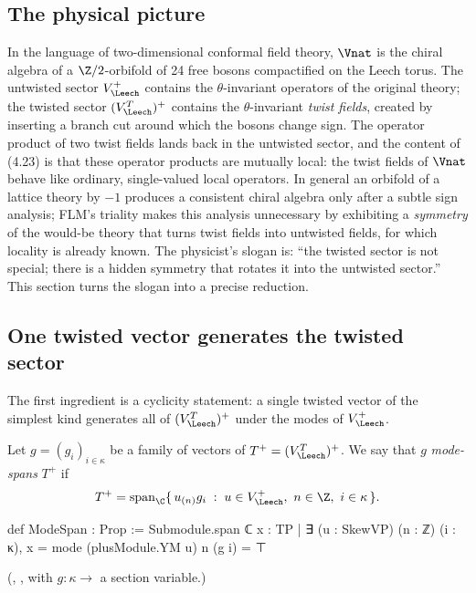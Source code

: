 \subsection{The physical picture}

In the language of two-dimensional conformal field theory, $\Vnat$ is the chiral algebra of a
$\Z/2$-orbifold of 24 free bosons compactified on the Leech torus.  The untwisted sector
$V_\Leech^+$ contains the $\theta$-invariant operators of the original theory; the twisted sector
$(V_\Leech^T)^+$ contains the $\theta$-invariant \emph{twist fields}, created by inserting a branch
cut around which the bosons change sign.  The operator product of two twist fields lands back in
the untwisted sector, and the content of (4.23) is that these operator products are mutually local:
the twist fields of $\Vnat$ behave like ordinary, single-valued local operators.  In general an
orbifold of a lattice theory by $-1$ produces a consistent chiral algebra only after a
subtle sign analysis; FLM's triality makes this analysis unnecessary by exhibiting a
\emph{symmetry} of the would-be theory that turns twist fields into untwisted fields, for which
locality is already known.  The physicist's slogan is: ``the twisted sector is not special; there is
a hidden symmetry that rotates it into the untwisted sector.''  This section turns the slogan into
a precise reduction.

\subsection{One twisted vector generates the twisted sector}

The first ingredient is a cyclicity statement: a single twisted vector of the simplest kind
generates all of $(V_\Leech^T)^+$ under the modes of $V_\Leech^+$.

\begin{definition}\label{ch14:def:modespan}
Let $g=(g_i)_{i\in\kappa}$ be a family of vectors of $T^+=(V_\Leech^T)^+$.  We say that $g$
\emph{mode-spans} $T^+$ if
\begin{equation*}
  T^{+}=\operatorname{span}_\C\{\,u_{(n)}g_i\;:\;u\in V_\Leech^+,\ n\in\Z,\ i\in\kappa\,\}.
\end{equation*}
\end{definition}

\begin{leancode}
def ModeSpan : Prop :=
  Submodule.span ℂ {x : TP | ∃ (u : SkewVP) (n : ℤ) (i : κ), x = mode (plusModule.YM u) n (g i)} = ⊤
\end{leancode}
(, , with $g:\kappa\to$
 a section variable.)

